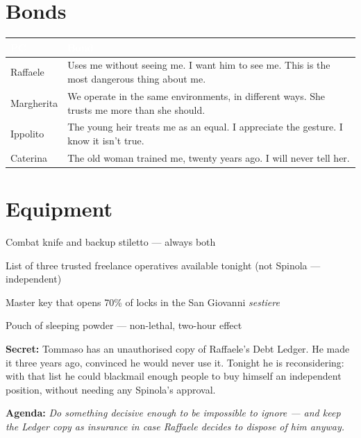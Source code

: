 \section*{Bonds}
\begin{table}[h]\centering\renewcommand{\arraystretch}{1.4}
\begin{tabularx}{\linewidth}{@{}L{2.6cm} X@{}}
\toprule{}
\textcolor{white}{\textbf{PC}} & \textcolor{white}{\textbf{Bond}} \\
\midrule
Raffaele & Uses me without seeing me. I want him to see me. This is the most dangerous thing about me. \\
Margherita & We operate in the same environments, in different ways. She trusts me more than she should. \\
Ippolito & The young heir treats me as an equal. I appreciate the gesture. I know it isn't true. \\
Caterina & The old woman trained me, twenty years ago. I will never tell her. \\
\bottomrule
\end{tabularx}
\end{table}

\section*{Equipment}
\begin{goldlist}
\item Combat knife and backup stiletto --- always both
\item List of three trusted freelance operatives available tonight (not Spinola --- independent)
\item Master key that opens 70\% of locks in the San Giovanni \textit{sestiere}
\item Pouch of sleeping powder --- non-lethal, two-hour effect
\end{goldlist}

\clearpage
\begin{secretbox}
\textbf{Secret:} Tommaso has an unauthorised copy of Raffaele's Debt Ledger. He made
it three years ago, convinced he would never use it. Tonight he is reconsidering: with
that list he could blackmail enough people to buy himself an independent position,
without needing any Spinola's approval.

\medskip\noindent\textcolor{SecretRed}{\textbf{Agenda:}}
\textit{Do something decisive enough to be impossible to ignore --- and keep the Ledger
copy as insurance in case Raffaele decides to dispose of him anyway.}
\end{secretbox}

